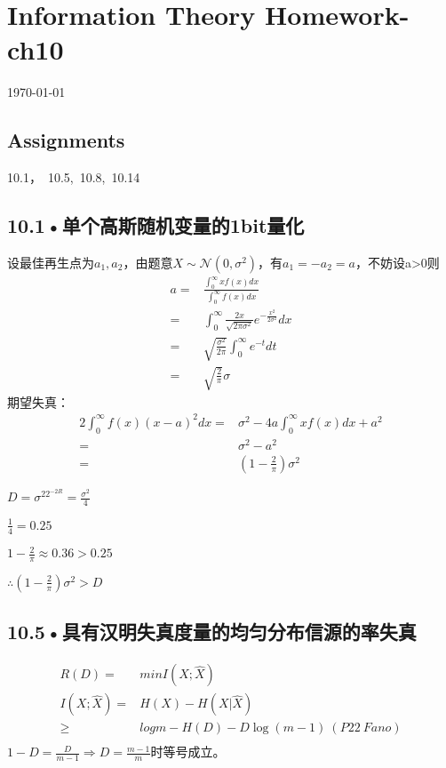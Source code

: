 \documentclass[UTF8]{ctexart}
\begin{document}
\section*{Information Theory Homework-ch10}
\begin{center}
\today
\end{center}
\subsection*{Assignments}


10.1，\ 10.5,\  10.8,\  10.14 


\subsection*{10.1•单个高斯随机变量的1bit量化}
设最佳再生点为$a_1,a_2$，由题意$X\sim\mathcal{N}(0,\sigma^2)$，有$a_1=-a_2=a$，不妨设a>0则
\begin{equation*}
    \begin{split}
        a = &\frac{\int_0^\infty xf(x)dx}{\int_0^\infty f(x)dx}\\
        =&\int_{0}^{\infty}\frac{2x}{\sqrt{2\pi\sigma^2}}e^{-\frac{x^2}{2\sigma^2}}dx\\
        =&\sqrt{\frac{\sigma^2}{2\pi}}\int_0^\infty e^{-t}dt\\
        =& \sqrt{\frac{2}{\pi}}\sigma
    \end{split}
\end{equation*}
期望失真：
\begin{equation*}
    \begin{split}
        2\int_0^\infty f(x)(x-a)^2dx=& \sigma^2 -4a\int_0^\infty xf(x)dx +a^2\\
        =&\sigma^2 - a^2\\
        =& (1-\frac{2}{\pi})\sigma^2
    \end{split}
\end{equation*}

$D = \sigma^22^{-2R}=\frac{\sigma^2}{4}$

$\frac{1}{4}=0.25$

$1-\frac{2}{\pi}\approx 0.36 > 0.25$

$\therefore (1-\frac{2}{\pi})\sigma^2>D$
\subsection*{10.5•具有汉明失真度量的均匀分布信源的率失真}
\begin{equation*}
    \begin{split}
        R(D)=& min I(X;\hat{X})\\
        I(X;\hat{X})=& H(X) - H(X|\hat{X})\\
        \geqslant &  log m - H(D) - D\log(m-1)\ (P22\ Fano)\\
    \end{split}
\end{equation*}
$1-D = \frac{D}{m-1}\Rightarrow D = \frac{m-1}{m}$时等号成立。
\end{document}
